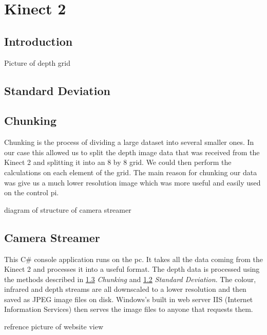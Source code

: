 \section{Kinect 2}

\subsection{Introduction}

Picture of depth grid

\subsection{Standard Deviation}\label{StandardDeviation}

\subsection{Chunking}\label{Chunking}
Chunking is the process of dividing a large dataset into several smaller ones. In our case this allowed us to split the depth image data that was received from the Kinect 2 and splitting it into an 8 by 8 grid. We could then perform the calculations on each element of the grid. The main reason for chunking our data was give us a much lower resolution image which was more useful and easily used on the control pi.

diagram of structure of camera streamer

\subsection{Camera Streamer}
This C\# console application runs on the pc. It takes all the data coming from the Kinect 2 and processes it into a useful format.
The depth data is processed using the methods described in \ref{Chunking} \textit{Chunking} and \ref{StandardDeviation} \textit{Standard Deviation}. The colour, infrared and depth streams are all downscaled to a lower resolution and then saved as JPEG image files on disk. Windows's built in web server IIS (Internet Information Services) then serves the image files to anyone that requests them.
  
refrence picture of website view

\pagestyle{euanstuart}













